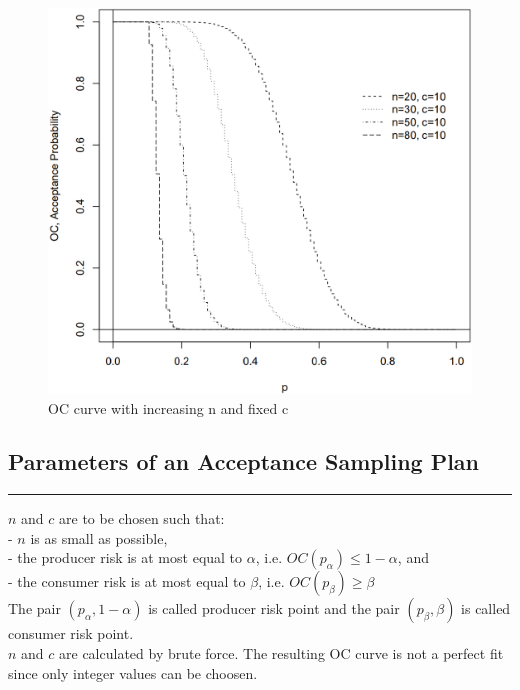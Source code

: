 \begin{figure}[H]
  \centering
  \includegraphics[width=0.8\linewidth]{Pics/5.1.3.png}
  \caption{OC curve with increasing n and fixed c}
\end{figure}

\subsection{Parameters of an Acceptance Sampling Plan}
\noindent\rule[\linienAbstand]{\linewidth}{\linienDicke}
$n$ and $c$ are to be chosen such that:\\
- $n$ is as small as possible,\\
- the producer risk is at most equal to $\alpha$, i.e. $OC(p_{\alpha}) \leq 1 - \alpha$, and\\
- the consumer risk is at most equal to $\beta$, i.e. $OC(p_{\beta}) \geq \beta$\\

The pair $(p_{\alpha}, 1-\alpha)$ is called producer risk point and the pair $(p_{\beta}, \beta)$ is called consumer risk point.\\
$n$ and $c$ are calculated by brute force. The resulting OC curve is not a perfect fit since only integer values can be choosen.\\

